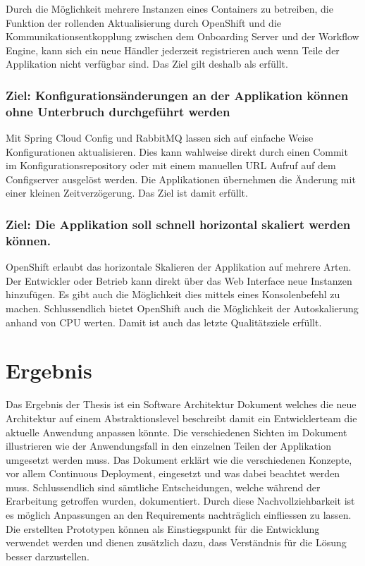Durch die Möglichkeit mehrere Instanzen eines Containers zu betreiben, die Funktion der rollenden Aktualisierung durch OpenShift und die Kommunikationsentkopplung zwischen dem Onboarding Server und der Workflow Engine, kann sich ein neue Händler jederzeit registrieren auch wenn Teile
der Applikation nicht verfügbar sind. Das Ziel gilt deshalb als erfüllt.

\subsubsection{Ziel: Konfigurationsänderungen an der Applikation können ohne Unterbruch durchgeführt werden}

Mit Spring Cloud Config und RabbitMQ lassen sich auf einfache Weise Konfigurationen aktualisieren. Dies kann wahlweise direkt durch einen Commit im Konfigurationsrepository oder mit einem manuellen URL Aufruf auf dem Configserver ausgelöst werden. Die Applikationen übernehmen die Änderung mit einer kleinen Zeitverzögerung. Das Ziel ist damit erfüllt.
\newpage

\subsubsection{Ziel: Die Applikation soll schnell horizontal skaliert werden können.}

OpenShift erlaubt das horizontale Skalieren der Applikation auf mehrere Arten. Der Entwickler oder Betrieb kann direkt über das Web Interface neue Instanzen hinzufügen. Es gibt auch die Möglichkeit dies mittels eines Konsolenbefehl zu machen. Schlussendlich bietet OpenShift auch die Möglichkeit der Autoskalierung anhand von CPU werten. Damit ist auch das letzte Qualitätsziele erfüllt.

\section{Ergebnis}

Das Ergebnis der Thesis ist ein Software Architektur Dokument welches die neue Architektur auf einem Abstraktionslevel beschreibt damit ein Entwicklerteam die aktuelle Anwendung anpassen könnte. Die verschiedenen Sichten im Dokument illustrieren wie der Anwendungsfall in den einzelnen Teilen der Applikation umgesetzt werden muss. Das Dokument erklärt wie die verschiedenen Konzepte, vor allem Continuous Deployment, eingesetzt und was dabei beachtet werden muss. Schlussendlich sind sämtliche Entscheidungen, welche während der Erarbeitung getroffen wurden, dokumentiert. Durch diese Nachvollziehbarkeit ist es möglich Anpassungen an den Requirements nachträglich einfliessen zu lassen.\newline
Die erstellten Prototypen können als Einstiegspunkt für die Entwicklung verwendet werden und dienen zusätzlich dazu, dass Verständnis für die Lösung besser darzustellen.
